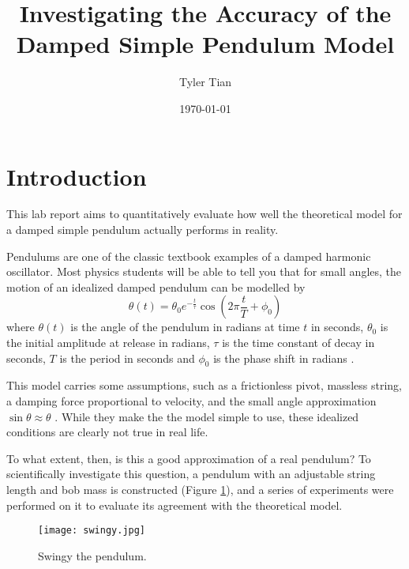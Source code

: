 \documentclass[aps,twocolumn,secnumarabic,nobalancelastpage,amsmath,amssymb,nofootinbib,floatfix,letterpaper]{revtex4}
\begin{document}
\title{Investigating the Accuracy of the Damped Simple Pendulum Model}
\author{Tyler Tian}
\noaffiliation
\date{\today}



\maketitle


\section{Introduction}

This lab report aims to quantitatively evaluate how well the theoretical model for a damped simple pendulum actually
performs in reality.

Pendulums are one of the classic textbook examples of a damped harmonic oscillator. Most physics students will be able
to tell you that for small angles, the motion of an idealized damped pendulum can be modelled by
\begin{equation}
    \theta(t) = \theta_0 e^{-\frac{t}{\tau}}\cos\left(2\pi\frac{t}{T} + \phi_0\right)
    \label{eqn:model}
\end{equation}
where \(\theta(t)\) is the angle of the pendulum in radians at time \(t\) in seconds, \(\theta_0\) is the initial
amplitude at release in radians, \(\tau\) is the time constant of decay in seconds, \(T\) is the period in seconds and
\(\phi_0\) is the phase shift in radians \cite{lab}.

This model carries some assumptions, such as a frictionless pivot, massless string, a damping force
proportional to velocity, and the small angle approximation \(\sin \theta \approx \theta\) \cite{period}. While they make the
the model simple to use, these idealized conditions are clearly not true in real life.

To what extent, then, is this a good approximation of a real pendulum? To scientifically investigate this question, a
pendulum with an adjustable string length and bob mass is constructed (Figure \ref{fig:swingy}), and a series of
experiments were performed on it to evaluate its agreement with the theoretical model.

\begin{figure}[htb]
    \centering
    \texttt{[image: swingy.jpg]}
    \caption{Swingy the pendulum.}
    \label{fig:swingy}
\end{figure}
\end{document}
